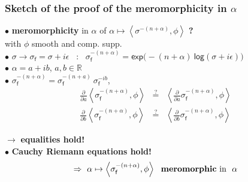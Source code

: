 \documentclass[9pt]{beamer}
\newcommand{\Smearip}[1]{\left\langle #1 \right\rangle} %
\newcommand{\expo}{\mathsf{exp}} %
\newcommand{\logar}{\mathsf{log}} %
\newcommand{\Rbb}{\mathbb{R}}
\newcommand{\fsf}{\mathsf{f}}
\begin{document}
\begin{frame}[label=proof_meromorphic]

\frametitle{Sketch of the proof of the meromorphicity in $\alpha$}

$\bullet$ \textbf{meromorphicity} in $\alpha$ of $\alpha \mapsto \Smearip{ \sigma^{-(n+\alpha)} , \phi }$ \textbf{?} \\
\hspace*{5pt} with $\phi$ smooth and comp. supp.%
\\[2pt]

$\bullet$ $\sigma \to \sigma_\fsf = \sigma + i \epsilon$ \ : \   $\sigma_\fsf^{-(n+\alpha)} = \expo\bigg(-(n+\alpha) \ \logar(\sigma + i \epsilon)\bigg)$ %
\\[2pt]
 
$\bullet$ $\alpha = a + i b$, \quad $a, b \in \Rbb$ \\[6pt]
 
$\bullet$  $\sigma_\fsf^{-(n+\alpha)} = \sigma_\fsf^{-(n+a)} \ \sigma_\fsf^{-ib}$, 
\begin{eqnarray*}
\frac{\partial}{\partial a} \Smearip{\sigma_\fsf^{-(n+\alpha)},\phi} 
&\overset{?}{=}&
\Smearip{\frac{\partial}{\partial a} \sigma_\fsf^{-(n+\alpha)} , \phi} \\
\frac{\partial}{\partial b} \Smearip{\sigma_\fsf^{-(n+\alpha)},\phi} 
&\overset{?}{=}&
\Smearip{\frac{\partial}{\partial b} \sigma_\fsf^{-(n+\alpha)} , \phi}
\end{eqnarray*}

$\to$ \textbf{equalities hold!} \\[2pt]
 
 
 
 
 $\bullet$ \textbf{Cauchy Riemann equations hold!} \\
 \begin{equation*}
 \Rightarrow \ \alpha \mapsto \Smearip{\sigma_\fsf^{-(n+\alpha)},\phi} \ \mbox{ \textbf{meromorphic} in } \ \alpha \hfill 
 \end{equation*}

 
 
 




\hfill \hyperlink{meromorphic}{}

\end{frame}
\end{document}
